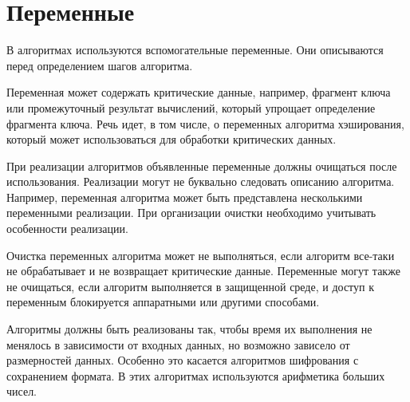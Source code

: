\section{Переменные}\label{COMMON.Vars}

В алгоритмах используются вспомогательные переменные. Они описываются 
перед определением шагов алгоритма. 

Переменная может содержать критические данные, например, фрагмент ключа или 
промежуточный результат вычислений, который упрощает определение фрагмента 
ключа.
%
Речь идет, в том числе, о переменных алгоритма хэширования, 
который может использоваться для обработки критических данных.

При реализации алгоритмов объявленные переменные должны очищаться после 
использования. Реализации могут не буквально следовать описанию алгоритма.
Например, переменная алгоритма может быть представлена несколькими 
переменными реализации. При организации очистки необходимо учитывать 
особенности реализации.

Очистка переменных алгоритма может не выполняться, если алгоритм все-таки 
не обрабатывает и не возвращает критические данные.
%
Переменные могут также не очищаться, если алгоритм выполняется в защищенной 
среде, и доступ к переменным блокируется аппаратными или другими способами.

Алгоритмы должны быть реализованы так, чтобы время их выполнения не 
менялось в зависимости от входных данных, но возможно зависело от 
размерностей данных. Особенно это касается алгоритмов шифрования с 
сохранением формата. В этих алгоритмах используются арифметика больших 
чисел.
\fi


